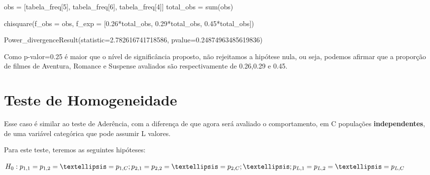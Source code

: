 \documentclass[
  letterpaper,
  DIV=11,
  numbers=noendperiod]{scrreprt}
\newenvironment{Shaded}{\begin{snugshade}}{\end{snugshade}}
\newcommand{\BuiltInTok}[1]{\textcolor[rgb]{0.00,0.23,0.31}{#1}}
\newcommand{\DecValTok}[1]{\textcolor[rgb]{0.68,0.00,0.00}{#1}}
\newcommand{\FloatTok}[1]{\textcolor[rgb]{0.68,0.00,0.00}{#1}}
\newcommand{\NormalTok}[1]{\textcolor[rgb]{0.00,0.23,0.31}{#1}}
\newcommand{\OperatorTok}[1]{\textcolor[rgb]{0.37,0.37,0.37}{#1}}
\begin{document}
\begin{Shaded}
\begin{Highlighting}[]
\NormalTok{obs }\OperatorTok{=}\NormalTok{ [tabela\_freq[}\DecValTok{5}\NormalTok{], tabela\_freq[}\DecValTok{6}\NormalTok{], tabela\_freq[}\DecValTok{4}\NormalTok{]]}
\NormalTok{total\_obs }\OperatorTok{=} \BuiltInTok{sum}\NormalTok{(obs)}

\NormalTok{chisquare(f\_obs }\OperatorTok{=}\NormalTok{ obs, f\_exp }\OperatorTok{=}\NormalTok{ [}\FloatTok{0.26}\OperatorTok{*}\NormalTok{total\_obs, }\FloatTok{0.29}\OperatorTok{*}\NormalTok{total\_obs, }\FloatTok{0.45}\OperatorTok{*}\NormalTok{total\_obs])}
\end{Highlighting}
\end{Shaded}

\begin{tcolorbox}[enhanced jigsaw, breakable, leftrule=.75mm, left=2mm, opacityback=0, bottomrule=.15mm, toprule=.15mm, rightrule=.15mm, arc=.35mm, colback=white]

Power\_divergenceResult(statistic=2.782616741718586,
pvalue=0.24874963485619836)

\end{tcolorbox}

Como p-valor=0.25 é maior que o nível de significância proposto, não
rejeitamos a hipótese nula, ou seja, podemos afirmar que a proporção de
filmes de Aventura, Romance e Suspense avaliados são respectivamente de
0.26,0.29 e 0.45.

\hypertarget{teste-de-homogeneidade}{%
\section{Teste de Homogeneidade}\label{teste-de-homogeneidade}}

Esse caso é similar ao teste de Aderência, com a diferença de que agora
será avaliado o comportamento, em C populações \textbf{independentes},
de uma variável categórica que pode assumir L valores.

Para este teste, teremos as seguintes hipóteses:

\(H_{0} : p_{1, 1} = p_{1, 2} = … = p_{1, C} \\ ; \\ p_{2, 1} = p_{2, 2} = … = p_{2, C} \\ ; \\ \\ … \\ \\ ; \\ p_{L, 1} = p_{L, 2} = … = p_{L, C}\)
\end{document}
